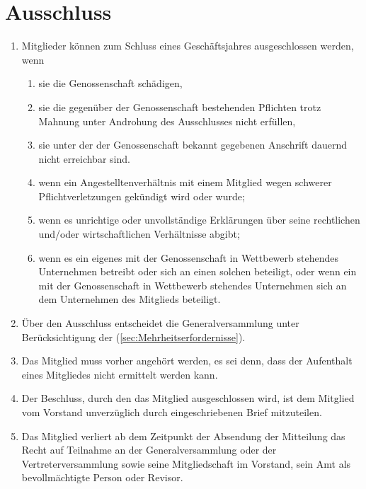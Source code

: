 \documentclass[a4paper, 12pt]{scrartcl}
\begin{document}
\section{Ausschluss}
\begin{enumerate}
  \item Mitglieder können zum Schluss eines Geschäftsjahres ausgeschlossen werden, wenn
  \begin{enumerate}
    \item sie die Genossenschaft schädigen,
    \item sie die gegenüber der Genossenschaft bestehenden Pflichten trotz Mahnung unter Androhung des Ausschlusses nicht erfüllen,
    \item sie unter der der Genossenschaft bekannt gegebenen Anschrift dauernd nicht erreichbar sind.
    \item wenn ein Angestelltenverhältnis mit einem Mitglied wegen schwerer Pflichtverletzungen gekündigt wird oder wurde;
    \item wenn es unrichtige oder unvollständige Erklärungen über seine rechtlichen und/oder wirtschaftlichen Verhältnisse abgibt;
    \item wenn es ein eigenes mit der Genossenschaft in Wettbewerb stehendes Unternehmen betreibt oder sich an einen solchen beteiligt, oder wenn ein mit der Genossenschaft in Wettbewerb stehendes Unternehmen sich an dem Unternehmen des Mitglieds beteiligt.
  \end{enumerate}
  \item Über den Ausschluss entscheidet die Generalversammlung unter Berücksichtigung der  (\ref{sec:Mehrheitserfordernisse}).
  \item Das Mitglied muss vorher angehört werden, es sei denn, dass der Aufenthalt eines Mitgliedes nicht ermittelt werden kann.
  \item Der Beschluss, durch den das Mitglied ausgeschlossen wird, ist dem Mitglied vom Vorstand unverzüglich durch eingeschriebenen Brief mitzuteilen.
  \item Das Mitglied verliert ab dem Zeitpunkt der Absendung der Mitteilung das Recht auf Teilnahme an der Generalversammlung oder der Vertreterversammlung sowie seine Mitgliedschaft im Vorstand, sein Amt als bevollmächtigte Person oder Revisor.
\end{enumerate}
\end{document}
